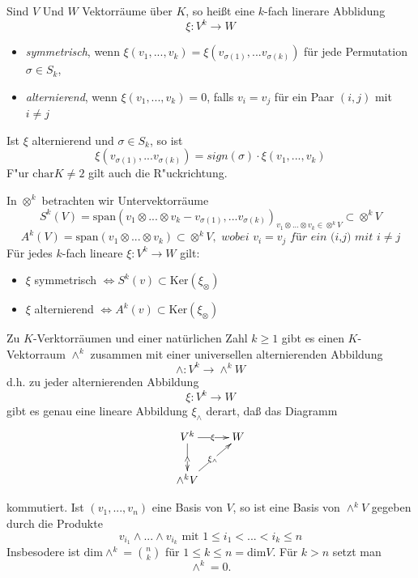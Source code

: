 \documentclass[11pt, a4paper]{article}
\begin{document}
\begin{definition}
Sind $V$ Und $W$ Vektorräume über $K$, so heißt eine $k$-fach linerare Abblidung
$$
\xi: V^k \rightarrow W
$$
\begin{itemize}
\item  \emph{symmetrisch}, wenn $\xi(v_1,...,v_k) = \xi(v_{\sigma(1)},...v_{\sigma(k)})$ für jede Permutation $\sigma \in S_k$,
\item \emph{alternierend}, wenn $\xi(v_1,...,v_k) = 0 $, falls $ v_i = v_j$ für ein Paar $(i,j)$ mit $i \neq j$
\end{itemize}
\end{definition}

\begin{remark}
Ist $\xi$ alternierend und $ \sigma  \in S_k$, so ist
$$ 
\xi(v_{\sigma(1)},...v_{\sigma(k)}) = \textit{sign}(\sigma) \cdot \xi(v_1,...,v_k)
$$
F"ur $\mathrm{char}K \neq 2$ gilt auch die R"uckrichtung.
\end{remark}

\begin{lemma}
In $\otimes^k$ betrachten wir Untervektorräume 
$$ 
S^k(V) = \mathrm{span} (v_1 \otimes... \otimes v_k  - v_{\sigma(1)},...v_{\sigma(k)})_{v_1 \otimes... \otimes v_k \in  \otimes^k V} \subset \otimes^k V
$$
$$ A^k(V) = \mathrm{span} (v_1 \otimes... \otimes v_k) \subset \otimes^k V, \textit{ wobei  } v_i = v_j \textit{ für ein (i,j) mit  } i\neq j 
$$
Für jedes $k$-fach lineare $\xi: V^k \rightarrow W$ gilt:
\begin{itemize}
\item $\xi$ symmetrisch $\Leftrightarrow S^k(v) \subset \mathrm{Ker}(\xi_\otimes)$
\item $\xi$ alternierend $\Leftrightarrow A^k(v) \subset \mathrm{Ker}(\xi_\otimes)$
\end{itemize}

\end{lemma}

\begin{theorem}
Zu $K$-Verktorräumen und einer natürlichen Zahl $k \geq 1$ gibt es einen $K$-Vektorraum
$\wedge^k$  zusammen mit einer universellen alternierenden Abbildung 
$$
\wedge: V^k \rightarrow \wedge ^k W
$$
d.h. zu jeder alternierenden Abbildung 
$$
\xi: V^k \rightarrow W
$$
gibt es genau eine lineare Abbildung $\xi_{\wedge}$ derart, daß das Diagramm 
\begin{gather*}
  \xymatrix{V^k   \ar[d]|{\wedge} \ar[r]|{\xi} & W\\
    \wedge^k V \ar[ur]|{\xi_\wedge} & }
\end{gather*}

kommutiert. Ist $(v_1,...,v_n)$ eine Basis von $V$, so ist eine Basis von $\wedge^k V$ gegeben durch die Produkte 
$$
v_{i_1} \wedge ... \wedge v_{i_k} \text{ mit } 1 \leq i_1 < ... <  i_k \leq n
$$
Insbesodere ist $\mathrm{dim}\wedge^k = \binom{n}{k}$ für $ 1 \leq k \leq n = \mathrm{dim}V$. Für $k>n$ setzt man 
$$
\wedge^k = 0.
$$


\end{theorem}
\end{document}
